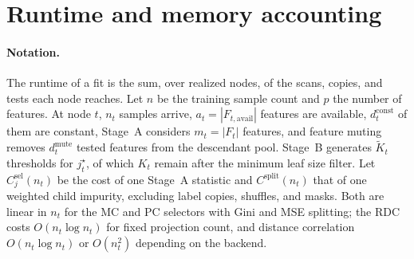 \section{Runtime and memory accounting}
\label{app:complexity-details}

\paragraph{Notation.}
The runtime of a fit is the sum, over realized nodes, of the scans, copies, and
tests each node reaches. Let $n$ be the training sample count and $p$ the
number of features. At node $t$, $n_t$ samples arrive,
$a_t=|F_{t,\mathrm{avail}}|$ features are available, $d_t^{\mathrm{const}}$ of
them are constant, Stage~A considers $m_t=|F_t|$ features, and feature muting
removes $d_t^{\mathrm{mute}}$ tested features from the descendant pool. Stage~B
generates $\tilde{K}_t$ thresholds for $j_t^\star$, of which $K_t$ remain after
the minimum leaf size filter. Let $C^{\mathrm{sel}}_j(n_t)$ be the cost of one
Stage~A statistic and $C^{\mathrm{split}}(n_t)$ that of one weighted child
impurity, excluding label copies, shuffles, and masks. Both are linear in $n_t$
for the MC and PC selectors with Gini and MSE splitting; the RDC costs
$O(n_t\log n_t)$ for fixed projection count, and distance correlation
$O(n_t\log n_t)$ or $O(n_t^2)$ depending on the backend.

